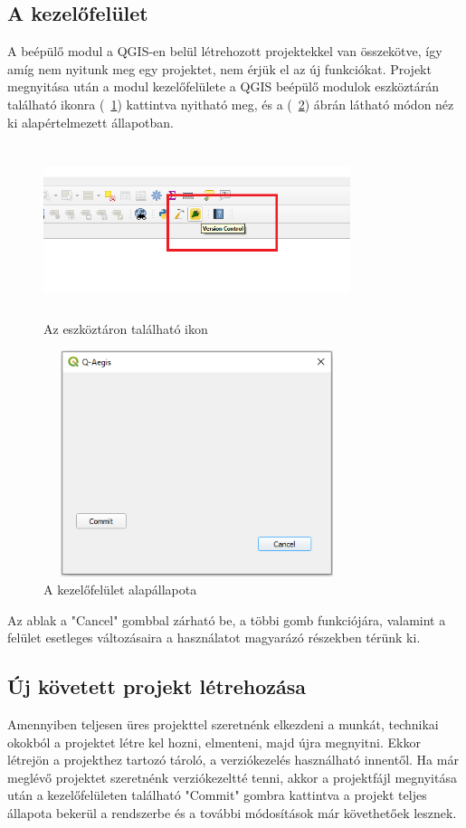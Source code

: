 \subsection{A kezelőfelület}
A beépülő modul a QGIS-en belül létrehozott projektekkel van összekötve, így amíg nem nyitunk meg egy projektet, nem érjük el az új funkciókat. Projekt megnyitása után a modul kezelőfelülete a QGIS beépülő modulok eszköztárán található ikonra (~\ref{fig:picture-2}) kattintva nyitható meg, és a (~\ref{fig:picture-3}) ábrán látható módon néz ki alapértelmezett állapotban.
\begin{figure}[H]
	\centering
	\includegraphics[width=0.8\textwidth,height=190px]{images/plugin_button.png}
	\caption{Az eszköztáron található ikon}
	\label{fig:picture-2}
\end{figure}
\begin{figure}[H]
	\centering
	\includegraphics[width=0.8\textwidth,height=250px]{images/norepo_state.png}
	\caption{A kezelőfelület alapállapota}
	\label{fig:picture-3}
\end{figure}
Az ablak a "Cancel" gombbal zárható be, a többi gomb funkciójára, valamint a felület esetleges változásaira a használatot magyarázó részekben térünk ki.
\subsection{Új követett projekt létrehozása}
Amennyiben teljesen üres projekttel szeretnénk elkezdeni a munkát, technikai okokból a projektet létre kel hozni, elmenteni, majd újra megnyitni. Ekkor létrejön a projekthez tartozó tároló, a verziókezelés használható innentől.
Ha már meglévő projektet szeretnénk verziókezeltté tenni, akkor a projektfájl megnyitása után a kezelőfelületen található "Commit" gombra kattintva a projekt teljes állapota bekerül a rendszerbe és a további módosítások már követhetőek lesznek.


